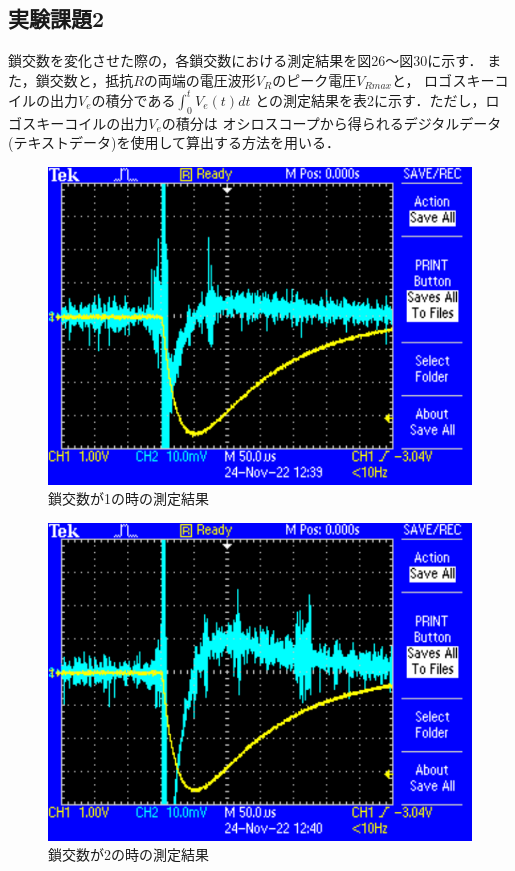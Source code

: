 \newpage

\subsection{実験課題2}
鎖交数を変化させた際の，各鎖交数における測定結果を図26～図30に示す．
また，鎖交数と，抵抗$R$の両端の電圧波形$V_R$のピーク電圧$V_{Rmax}$と，
ロゴスキーコイルの出力$V_e$の積分である$\int_{0}^{t}V_e(t)dt$
との測定結果を表2に示す．ただし，ロゴスキーコイルの出力$V_e$の積分は
オシロスコープから得られるデジタルデータ
(テキストデータ)を使用して算出する方法を用いる．

\begin{figure}[H]
    \centering
    \includegraphics[scale=0.5]{rogowskii-1.pdf}
    \caption{鎖交数が1の時の測定結果}
\end{figure}

\begin{figure}[H]
    \centering
    \includegraphics[scale=0.5]{rogowskii-2.pdf}
    \caption{鎖交数が2の時の測定結果}
\end{figure}

